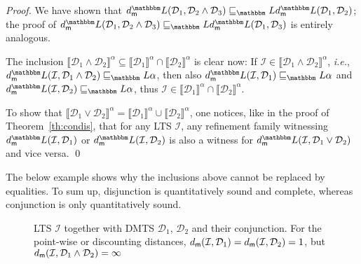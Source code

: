 \documentclass[twocolumn]{svjour3-dummy}
\newcommand*\ie{\textit{i.e.},}
\newcommand*\cI{\mathcal I}
\newcommand*\cD{\mathcal D}
\newcommand*\sem[1]{\llbracket #1\rrbracket}
\newcommand*\LL{\mathbbm L}
\newcommand*\md{d_\textup{\textsf{m}}} \newcommand*\mdl{\smash{\md^\LL}}
\begin{document}
\begin{proof}
  We have shown that $\mdl( \cD_1, \cD_2\land \cD_3)\sqsubseteq_\LL
  \mdl( \cD_1, \cD_2)$; the proof of $\mdl( \cD_1, \cD_2\land
  \cD_3)\sqsubseteq_\LL \mdl( \cD_1, \cD_3)$ is entirely analogous.

  The inclusion $\sem{ \cD_1\land \cD_2}^\alpha\subseteq \sem{
    \cD_1}^\alpha\cap \sem{ \cD_2}^\alpha$ is clear now: If $\cI\in
  \sem{ \cD_1\land \cD_2}^\alpha$, \ie~$\mdl( \cI, \cD_1\land
  \cD_2)\sqsubseteq_\LL \alpha$, then also $\mdl( \cI,
  \cD_1)\sqsubseteq_\LL \alpha$ and $\mdl( \cI, \cD_2)\sqsubseteq_\LL
  \alpha$, thus $\cI\in \sem{ \cD_1}^\alpha\cap \sem{ \cD_2}^\alpha$.

  To show that $\sem{ \cD_1\lor \cD_2}^\alpha= \sem{ \cD_1}^\alpha\cup
  \sem{ \cD_2}^\alpha$, one notices, like in the proof of
  Theorem~\ref{th:condis}, that for any LTS $\cI$, any refinement family
  witnessing $\mdl( \cI, \cD_1)$ or $\mdl( \cI, \cD_2)$ is also a
  witness for $\mdl( \cI, \cD_1\lor \cD_2)$ and vice versa. \qed
\end{proof}

The below example shows why the inclusions above cannot be replaced by
equalities.  To sum up, disjunction is quantitatively sound and
complete, whereas conjunction is only quantitatively sound.

\begin{figure}\centering
  \caption{\label{fi:ex-conj}
    LTS $\cI$ together with DMTS $\cD_1$, $\cD_2$ and their conjunction.
    For the point-wise or discounting distances, $\md( \cI, \cD_1)= \md(
    \cI, \cD_2)= 1$, but $\md( \cI, \cD_1\land \cD_2)= \infty$}
\end{figure}
\end{document}
